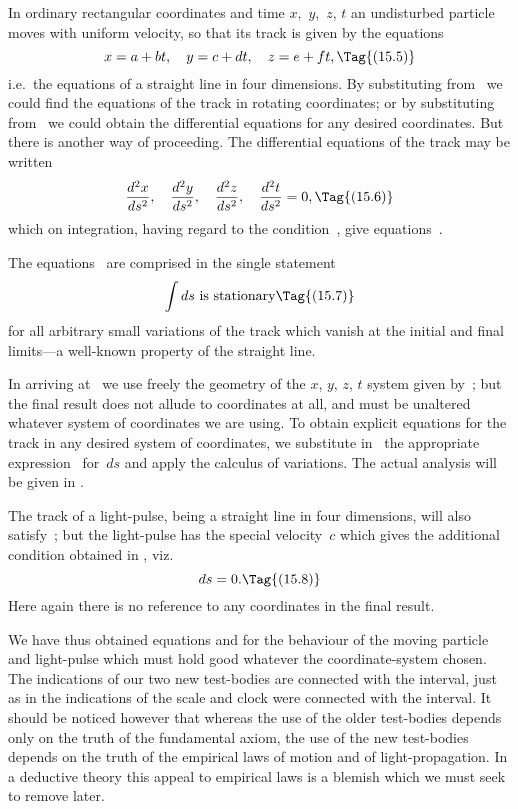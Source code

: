 \documentclass[12pt]{book}
\begin{document}
In ordinary rectangular coordinates and time $x$,~$y$,~$z$, $t$ an undisturbed
particle moves with uniform velocity, so that its track is given by the
equations
\[
x = a + bt,\quad
y = c + dt,\quad
z = e + ft,
\Tag{(15.5)}
\]
i.e.\ the equations of a straight line in four dimensions. By substituting from~
we could find the equations of the track in rotating coordinates; or by
substituting from~ we could obtain the differential equations for any
desired coordinates. But there is another way of proceeding. The differential
equations of the track may be written
\[
\frac{d^{2} x}{ds^{2}},\quad
\frac{d^{2} y}{ds^{2}},\quad
\frac{d^{2} z}{ds^{2}},\quad
\frac{d^{2} t}{ds^{2}} = 0,
\Tag{(15.6)}
\]
which on integration, having regard to the condition~, give equations~.

The equations~ are comprised in the single statement
\[
\int ds \text{ is stationary}
\Tag{(15.7)}
\]
for all arbitrary small variations of the track which vanish at the initial and
final limits---a well-known property of the straight line.

In arriving at~ we use freely the geometry of the $x$, $y$, $z$, $t$ system
%
%
given by~; but the final result does not allude to coordinates at all, and
must be unaltered whatever system of coordinates we are using. To obtain
explicit equations for the track in any desired system of coordinates, we
substitute in~ the appropriate expression~ for~$ds$ and apply the
calculus of variations. The actual analysis will be given in .

The track of a light-pulse, being a straight line in four dimensions, will
%
also satisfy~; but the light-pulse has the special velocity~$c$ which gives
the additional condition obtained in , viz.
\[
ds = 0.
\Tag{(15.8)}
\]
Here again there is no reference to any coordinates in the final result.

We have thus obtained equations  and  for the behaviour of
the moving particle and light-pulse which must hold good whatever the
coordinate-system chosen. The indications of our two new test-bodies are
connected with the interval, just as in  the indications of the scale and
clock were connected with the interval. It should be noticed however that
whereas the use of the older test-bodies depends only on the truth of the
fundamental axiom, the use of the new test-bodies depends on the truth of the
empirical laws of motion and of light-propagation. In a deductive theory this
appeal to empirical laws is a blemish which we must seek to remove later.
\end{document}
